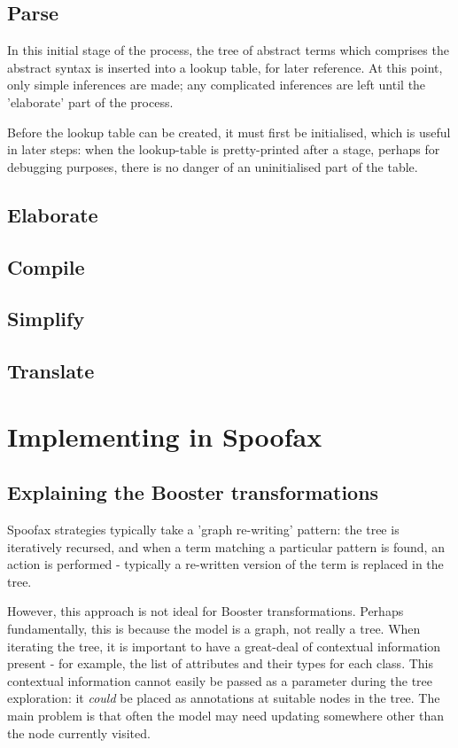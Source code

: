 \subsection{Parse}

In this initial stage of the process, the tree of abstract terms which
comprises the abstract syntax is inserted into a lookup table, for
later reference.  At this point, only simple inferences are made; any
complicated inferences are left until the 'elaborate' part of the
process.

Before the lookup table can be created, it must first be initialised,
which is useful in later steps: when the lookup-table is
pretty-printed after a stage, perhaps for debugging purposes, there is
no danger of an uninitialised part of the table.
 
\subsection{Elaborate}
\subsection{Compile}
\subsection{Simplify}
\subsection{Translate}
  
\section{Implementing in Spoofax}

\subsection{Explaining the Booster transformations}

Spoofax strategies typically take a 'graph re-writing' pattern: the
tree is iteratively recursed, and when a term matching a particular
pattern is found, an action is performed - typically a re-written
version of the term is replaced in the tree.

However, this approach is not ideal for Booster transformations.
Perhaps fundamentally, this is because the model is a graph, not
really a tree.  When iterating the tree, it is important to have a
great-deal of contextual information present - for example, the list
of attributes and their types for each class.  This contextual
information cannot easily be passed as a parameter during the tree
exploration: it \emph{could} be placed as annotations at suitable nodes in
the tree.  The main problem is that often the model may need updating
somewhere other than the node currently visited.  

